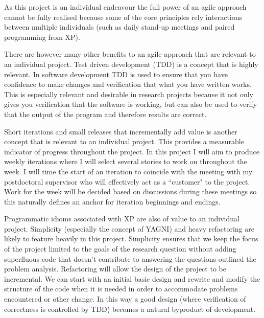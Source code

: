 As this project is an individual endeavour the full power of an agile approach cannot be fully realised because some of the core principles rely interactions between multiple individuals (such as daily stand-up meetings and paired programming from XP).

There are however many other benefits to an agile approach that are relevant to an individual project. Test driven development (TDD) is a concept that is highly relevant. In software development TDD is used to ensure that you have confidence to make changes and verification that what you have written works. This is especially relevant and desirable in research projects because it not only gives you verification that the software is working, but can also be used to verify that the output of the program and therefore results are correct.

Short iterations and small releases that incrementally add value is another concept that is relevant to an individual project. This provides a measurable indicator of progress throughout the project. In this project I will aim to produce weekly iterations where I will select several stories to work on throughout the week. I will time the start of an iteration to coincide with the meeting with my postdoctoral supervisor who will effectively act as a ``customer" to the project. Work for the week will be decided based on discussions during these meetings so this naturally defines an anchor for iteration beginnings and endings.

Programmatic idioms associated with XP are also of value to an individual project. Simplicity (especially the concept of YAGNI) and heavy refactoring are likely to feature heavily in this project. Simplicity ensures that we keep the focus of the project limited to the goals of the research question without adding superfluous code that doesn't contribute to answering the questions outlined the problem analysis. Refactoring will allow the design of the project to be incremental. We can start with an initial basic design and rewrite and modify the structure of the code when it is needed in order to accommodate problems encountered or other change. In this way a good design (where verification of correctness is controlled by TDD) becomes a natural byproduct of development.


